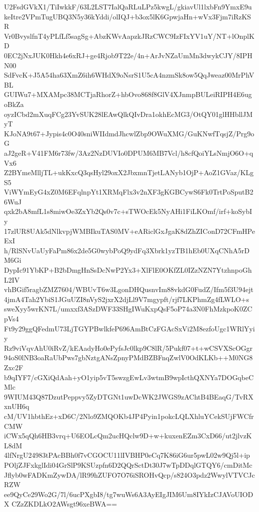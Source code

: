 U2FsdGVkX1/TiIwkkF/63L2LST7IalQaRLuLPz5kwgL/gkiavUl1lxbFn9YmxE9u
keItre2VPmTugUBQ3N5y36kYddi/olIQJ+b3ox5lK6GpwjaHn+wVx3Fjm7iRzKSR
Vr0BvyslfnT4yPLfLf5sagSg+AbzKWvAapzkJRzCWC9IzFIxYV1uY/NT+lOnplKD
0EC2jNxJUK0Hkh4e6xRJ+ge4Rjob9T22e/4n+ArJvNZaUmMn3dwykCJY/8IPHN00
SdFvcK+J5A54ha63XmZ6ih6WHdX9oNsrS1U5cA4nzmSk8ow5QqJweaz00MrPhVBL
GUIWu7+MXAMpc38MCTjaRhorZ+hbOvo868f8GlV4XJnmpBULeiRIPH4E6ugoBkZa
oyzICbd2mXuqFCg23YvSUK28lEAwQlkQIvDra1okhEcMG3/OtQY01glHHbllJMyT
KJoNA9t67+Jypis4c0O40sniWIIdmdJhcwlZbp9OWuXMG/GuKNwfTqsjZ/Prg9oG
aJ2geR+V41FM6r73fw/3Az2NzDUVIo0DPUM6MB7Vcl/h8cfQoiYLsNmjO6O+qVx6
Z2BYmeMlljTL+ukKxcQ3qsHyl29oxX2JbxmnTjetLANyb1OjP+AoZ1GVaz/KLgS5
ViWYmEyG4xZ0M6EFqlnpYt1XRMqFlx3v2nXF3gKGBCywS6Fk0TrtPoSputB26WuJ
qxk2bA8mfL1s8miwOe3ZxYb2Qs0v7c+sTWOcEk5NyAHi1FiLKOmf/irf+koSybIy
17zlUR8UAk5dNlkvpjWMBIkuTAS0MV+eARiclGxJgaK8dZhZIConD72CFmHPeExI
h/RlSNvUaUyFaPm86x2de5G0wybPoQ9ydFq3Xbrk1yzTB1hEb0UXqCNhA5rDM6Gi
DypIc91YbKP+B2bDmgHnSsDcNwP2Yx3+XlFlE0OKfZL0IZzNZN7YtzhnpoGhL2IV
vhBGif5ragbZMZ7604/WBUvT6w3LgonDHQusnvIm88vkdG0FudZ/Ifm5f3U94ejt
4jmA4Tah2YbiS1JGuUZI8nVyS2jxrX2djLl9V7mgypft/rjf7LKPhmZg4fLWLO+s
sweXyy5wrKN7L/umxxf3ASzDWF33SHgIWuKxpQsF5oP74a3N0FhMzkpoK0ZCpVs4
Ft9y29ggQFedmU73LjTGYPBwlkfeP696AmBtCzFGAcSxVi2M8ezfoUgc1WRlYyiy
Rz9viVqvAhU0iRvZ/kEAadyHo0ePyfsJc0lkp9C8lR/5Pukf07+t+wCSVXScOGgr
94oS0lNB3oaRaUbPws7gbNztgANsZpnyPMdBZBFnqZwlV0OdKLKb++M0NG8Zxc2F
b9qIYF7/cGXiQdAah+yO1yip5vT5swzgEwLv3wtmB9wpIcthQXNYa7DOGqbeCMlc
9WIUM43Q87DzutPeppvy5ZyDTGNt1uwDcWK2JWGS9zAChtB4BEaqG/TvRXxnUH6q
cM/UV1hbthEz+xD6C/2Nlo9ZMQOKb4JP4Pyin1pokcLQLXhluYCekSUjFWCfrCMW
iCWx5qQh6HB3vrq+U6EOLcQm2ucHQclw9D+w+kuxenEZm3CxD66/ut2jlvzKL8dM
4lfNrgU24983tPAcBBh0f7vCGOCU11lIVBHP0eCq7K86iG6ur5pwL02w9Qj5l+ip
POljZJFxkglIdi04GrSlP9KSUzpfn6D2QQrSctDt30J7wTpDDqlGTQY6/cmDitMc
Jflyb0wFADKmZywDA/lR99hZUFO7O76iSROHvQcp/s824O3pdz2WwylVTVCJcRZW
ee9QyCe29Wo2G/7l/6ucPXgbI8/tg7wuWs6A3AyEIgJIM6Um8IYkIzCJAVoUIODX
CZzZKDLkO2AWsgt96xeBWA==
